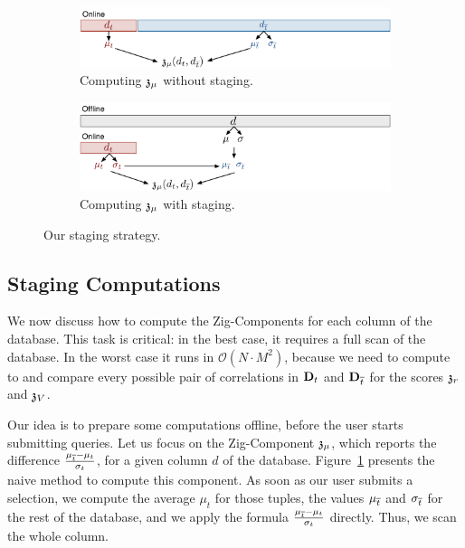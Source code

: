 \begin{figure}[t!]
    \centering
    \begin{subfigure}[b]{\columnwidth}
    \includegraphics[width=\textwidth]{Figures/Staging}
    \caption{Computing $\mathfrak{z}_\mu$ without staging.}
    \label{pic:withoutstag}
    \end{subfigure}

    \begin{subfigure}[b]{\columnwidth}
        \includegraphics[width=\textwidth]{Figures/Staging2}
    \caption{Computing  $\mathfrak{z}_\mu$  with staging.}
    \label{pic:withstag}
    \end{subfigure}
    \caption{Our staging strategy.}
\end{figure}


\subsection{Staging Computations}
\label{sec:optimization}

We now discuss how to compute the Zig-Components for each column of the
database. This task is critical: in the best case, it requires a full scan of
the database. In the worst case it runs in $\mathcal{O}(N \cdot M^2)$, because
we need to compute to and compare every possible pair of correlations in
$\mathbf{D}_t$ and $\mathbf{D}_{\overline{t}}$ for the scores $\mathfrak{z}_r$ and $\mathfrak{z}_V$.

Our idea is to prepare some computations offline, before the user starts
submitting queries.  Let us focus on the Zig-Component $\mathfrak{z}_\mu$, which
reports the difference $\frac{\mu_{\overline{t}} - \mu_{t}}{\sigma_t}$, for a given
column $d$ of the database.  Figure~\ref{pic:withoutstag} presents the naive
method to compute this component.  As soon as our user submits a selection, we
compute the average $\mu_t$ for those tuples, the values $\mu_{\overline{t}}$ and
$\sigma_{\overline{t}}$ for the rest of the database, and we apply the formula
$\frac{\mu_{\overline{t}} - \mu_{t}}{\sigma_t}$  directly. Thus, we scan the whole
column.

